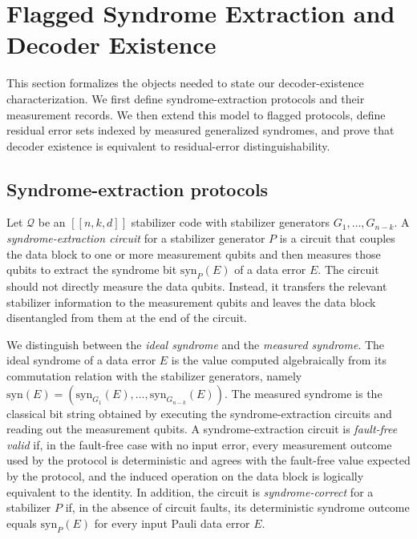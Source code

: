 \documentclass[acmsmall,screen,review,anonymous,nonacm]{acmart}
\begin{document}



\section{Flagged Syndrome Extraction and Decoder Existence}\label{sec:flagged-decoder-existence}
This section formalizes the objects needed to state our decoder-existence characterization. We first define syndrome-extraction protocols and their measurement records. We then extend this model to flagged protocols, define residual error sets indexed by measured generalized syndromes, and prove that decoder existence is equivalent to residual-error distinguishability.
\subsection{Syndrome-extraction protocols}
\label{subsec:syndrome-extraction-protocols}
Let $\mathcal{Q}$ be an $[[n,k,d]]$ stabilizer code with stabilizer generators $G_1,\ldots,G_{n-k}$. A \emph{syndrome-extraction circuit} for a stabilizer generator $P$ is a circuit that couples the data block to one or more measurement qubits and then measures those qubits to extract the syndrome bit $\mathrm{syn}_P(E)$ of a data error $E$. The circuit should not directly measure the data qubits. Instead, it transfers the relevant stabilizer information to the measurement qubits and leaves the data block disentangled from them at the end of the circuit.

We distinguish between the \emph{ideal syndrome} and the \emph{measured syndrome}. The ideal syndrome of a data error $E$ is the value computed algebraically from its commutation relation with the stabilizer generators, namely
$\mathrm{syn}(E)=(\mathrm{syn}_{G_1}(E),\ldots,\mathrm{syn}_{G_{n-k}}(E))$.
The measured syndrome is the classical bit string obtained by executing the syndrome-extraction circuits and reading out the measurement qubits. 
A syndrome-extraction circuit is \emph{fault-free valid} if, in the fault-free case with no input error, every measurement outcome used by the protocol is deterministic and agrees with the fault-free value expected by the protocol, and the induced operation on the data block is logically equivalent to the identity.
In addition, the circuit is \emph{syndrome-correct} for a stabilizer $P$ if, in the absence of circuit faults, its deterministic syndrome outcome equals $\mathrm{syn}_P(E)$ for every input Pauli data error $E$.
\end{document}
